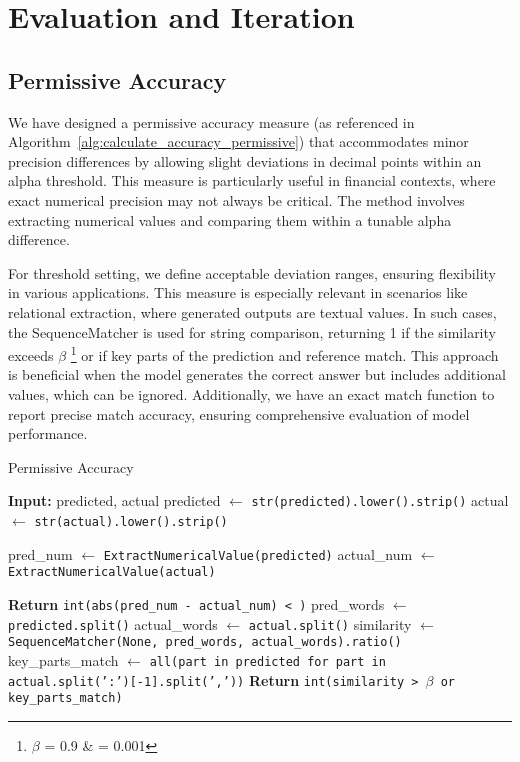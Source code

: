 \documentclass[logo,msc]{infthesis}           %
\begin{document}
\section{Evaluation and Iteration}
\subsection{Permissive Accuracy}
We have designed a permissive accuracy measure (as referenced in Algorithm~\ref{alg:calculate_accuracy_permissive}) that accommodates minor precision differences by allowing slight deviations in decimal points within an alpha threshold. This measure is particularly useful in financial contexts, where exact numerical precision may not always be critical. The method involves extracting numerical values and comparing them within a tunable alpha difference.

For threshold setting, we define acceptable deviation ranges, ensuring flexibility in various applications. This measure is especially relevant in scenarios like relational extraction, where generated outputs are textual values. In such cases, the SequenceMatcher is used for string comparison, returning 1 if the similarity exceeds $\beta$ \footnote{$\beta$ = 0.9 \& \alpha = 0.001}  or if key parts of the prediction and reference match. This approach is beneficial when the model generates the correct answer but includes additional values, which can be ignored. Additionally, we have an exact match function to report precise match accuracy, ensuring comprehensive evaluation of model performance.
\begin{algorithm}
\caption{Permissive Accuracy}
\label{alg:calculate_accuracy_permissive}
\begin{algorithmic}[H]
    \State \textbf{Input:} predicted, actual
    \State predicted $\gets$ \texttt{str(predicted).lower().strip()}
    \State actual $\gets$ \texttt{str(actual).lower().strip()}
    
    \State pred\_num $\gets$ \texttt{ExtractNumericalValue(predicted)}
    \State actual\_num $\gets$ \texttt{ExtractNumericalValue(actual)}
    
        \State \textbf{Return} \texttt{int(abs(pred\_num - actual\_num) < \alpha)}
    \Else
        \State pred\_words $\gets$ \texttt{predicted.split()}
        \State actual\_words $\gets$ \texttt{actual.split()}
        \State similarity $\gets$ \texttt{SequenceMatcher(None, pred\_words, actual\_words).ratio()}
        \State key\_parts\_match $\gets$ \texttt{all(part in predicted for part in actual.split(':')[-1].split(','))}
        \State \textbf{Return} \texttt{int(similarity > $\beta$ or key\_parts\_match)}
    \EndIf
\EndFunction
\end{algorithmic}
\end{algorithm}
\end{document}
